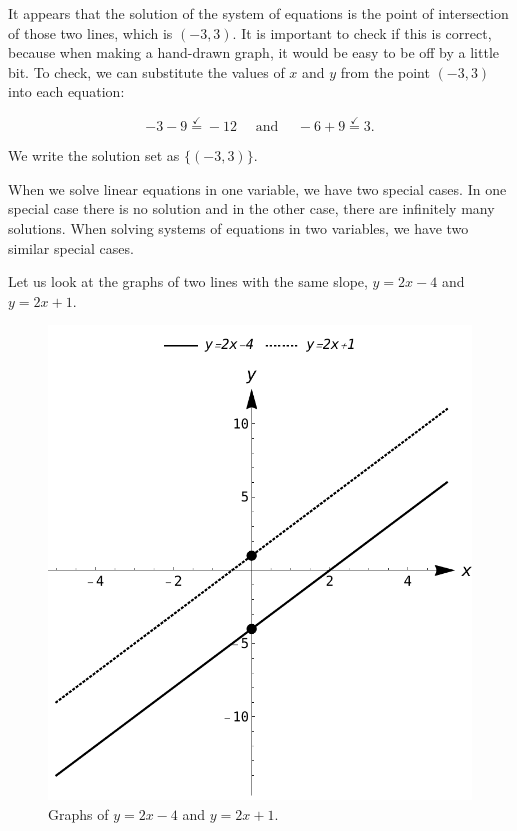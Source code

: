 \begin{example}
It appears that the solution of the system of equations is the point of intersection of those two lines, which is $(-3,3)$. It is important to check if this is correct, because when making a hand-drawn graph, it would be easy to be off by a little bit. To check, we can substitute the values of $x$ and $y$ from the point $(-3,3)$ into each equation: 

\[ -3-9 \stackrel{\checkmark}{=} -12 \quad \text{ and } \quad  -6+9 \stackrel{\checkmark}{=} 3.  \]


We write the solution set as $\{(-3,3)\}$.

\end{example}


When we solve linear equations in one variable, we have two special cases. In one special case there is no solution and in the other case, there are infinitely many solutions. When solving systems of equations in two variables, we have two similar special cases.


Let us look at the graphs of two lines with the same slope, $y=2x-4$ and $y=2x+1$.
	
\begin{figure}[H]
	\centering
	\includegraphics[scale=0.6]{fig_Systems_lin_eq_3}
	\caption{Graphs of $y=2x-4$ and $y=2x+1$.}
	\label{fig_Systems_lin_eq_3}
\end{figure}	

